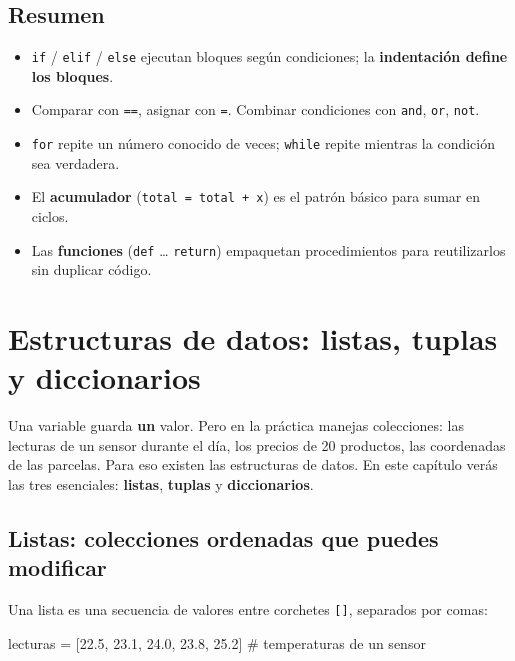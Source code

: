 \documentclass[
  spanish,
  letterpaper,
  DIV=11,
  numbers=noendperiod]{scrreprt}
\newenvironment{Shaded}{\begin{snugshade}}{\end{snugshade}}
\newcommand{\CommentTok}[1]{\textcolor[rgb]{0.37,0.37,0.37}{#1}}
\newcommand{\FloatTok}[1]{\textcolor[rgb]{0.68,0.00,0.00}{#1}}
\newcommand{\NormalTok}[1]{\textcolor[rgb]{0.00,0.23,0.31}{#1}}
\newcommand{\OperatorTok}[1]{\textcolor[rgb]{0.37,0.37,0.37}{#1}}
\providecommand{\tightlist}{%
  \setlength{\itemsep}{0pt}\setlength{\parskip}{0pt}}
\begin{document}
\section{Resumen}\label{resumen-2}

\begin{itemize}
\tightlist
\item
  \texttt{if} / \texttt{elif} / \texttt{else} ejecutan bloques según
  condiciones; la \textbf{indentación define los bloques}.
\item
  Comparar con \texttt{==}, asignar con \texttt{=}. Combinar condiciones
  con \texttt{and}, \texttt{or}, \texttt{not}.
\item
  \texttt{for} repite un número conocido de veces; \texttt{while} repite
  mientras la condición sea verdadera.
\item
  El \textbf{acumulador} (\texttt{total\ =\ total\ +\ x}) es el patrón
  básico para sumar en ciclos.
\item
  Las \textbf{funciones} (\texttt{def} \ldots{} \texttt{return})
  empaquetan procedimientos para reutilizarlos sin duplicar código.
\end{itemize}


\chapter{Estructuras de datos: listas, tuplas y
diccionarios}\label{estructuras-de-datos-listas-tuplas-y-diccionarios}

Una variable guarda \textbf{un} valor. Pero en la práctica manejas
colecciones: las lecturas de un sensor durante el día, los precios de 20
productos, las coordenadas de las parcelas. Para eso existen las
estructuras de datos. En este capítulo verás las tres esenciales:
\textbf{listas}, \textbf{tuplas} y \textbf{diccionarios}.

\section{Listas: colecciones ordenadas que puedes
modificar}\label{listas-colecciones-ordenadas-que-puedes-modificar}

Una lista es una secuencia de valores entre corchetes \texttt{{[}{]}},
separados por comas:

\begin{Shaded}
\begin{Highlighting}[]
\NormalTok{lecturas }\OperatorTok{=}\NormalTok{ [}\FloatTok{22.5}\NormalTok{, }\FloatTok{23.1}\NormalTok{, }\FloatTok{24.0}\NormalTok{, }\FloatTok{23.8}\NormalTok{, }\FloatTok{25.2}\NormalTok{]  }\CommentTok{\# temperaturas de un sensor}
\end{Highlighting}
\end{Shaded}
\end{document}
